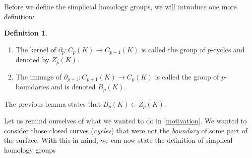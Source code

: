 \documentclass[toc=bib, headinclude]{scrartcl}
\theoremstyle{plain}
\theoremstyle{definition}
\newtheorem	{definition}[theorem]{Definition}
\theoremstyle{remark}
\begin{document}
Before we define the simplicial homology groups, we will introduce one more definition:

\begin{definition}\mbox{}
	\begin{enumerate}
		\item The kernel of $\partial_p: C_p(K)\to C_{p-1}(K)$ is called the group of $p$-cycles and denoted by $Z_p(K)$.
		\item The immage of $\partial_{p+1}: C_{p+1}(K)\to C_{p}(K)$ is called the group of $p$-boundaries and is denoted $B_p(K)$.
	\end{enumerate}
	
\end{definition}
The previous lemma states that $B_p(K)\subset Z_p(K)$.

Let us remind ourselves of what we wanted to do in \autoref{motivation}. We wanted to consider those closed curves (\emph{cycles}) that were not the \emph{boundary} of some part of the surface. With this in mind, we can now state the definition of simplical homology groups
\end{document}
